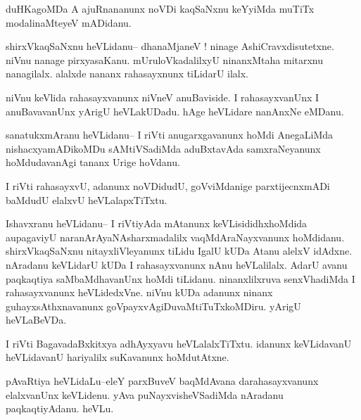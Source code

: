 \documentclass{article}
\begin{document}
\begin{mn}%
duHKagoMDa A ajuRnananunx noVDi kaqSaNxnu keYyiMda muTiTx modalinaMteyeV mADidanu.
\end{mn}

\begin{mn}%
shirxVkaqSaNxnu heVLidanu-- dhanaMjaneV ! ninage AshiCravxdisutetxne. niVnu nanage 
pirxyasaKanu. mUruloVkadalilxyU  ninanxMtaha mitarxnu nanagilalx. alalxde nananx 
rahasayxnunx tiLidarU ilalx.
\end{mn}

\begin{mn}%
niVnu keVlida rahasayxvanunx niVneV anuBaviside. I rahasayxvanUnx I anuBavavanUnx yArigU 
heVLakUDadu. hAge heVLidare nanAnxNe eMDanu.
\end{mn}

\begin{mn}%
sanatukxmAranu heVLidanu-- I riVti anugarxgavanunx hoMdi AnegaLiMda nishacxyamADikoMDu 
sAMtiVSadiMda aduBxtavAda samxraNeyanunx hoMdudavanAgi tananx Urige hoVdanu.
\end{mn}

\begin{mn}%
I riVti rahasayxvU, adanunx noVDidudU, goVviMdanige parxtijecnxmADi baMdudU elalxvU 
heVLalapxTiTxtu.
\end{mn}

\begin{mn}%
Ishavxranu heVLidanu-- I riVtiyAda mAtanunx keVLisididhxhoMdida aupagaviyU 
naranArAyaNAsharxmadalilx vaqMdAraNayxvanunx hoMdidanu. shirxVkaqSaNxnu nitayxliVleyanunx 
tiLidu IgalU kUDa Atanu alelxV idAdxne. nAradanu keVLidarU kUDa I rahasayxvanunx nAnu 
heVLalilalx. AdarU avanu paqkaqtiya saMbaMdhavanUnx hoMdi tiLidanu. ninanxlilxruva 
senxVhadiMda I rahasayxvanunx heVLidedxVne. niVnu kUDa adanunx ninanx guhayxsAthxnavanunx 
goVpayxvAgiDuvaMtiTuTxkoMDiru. yArigU heVLaBeVDa.
\end{mn}

\begin{mn}%
I riVti BagavadaBxkitxya adhAyxyavu heVLalalxTiTxtu. idanunx keVLidavanU heVLidavanU 
hariyalilx suKavanunx hoMdutAtxne.
\end{mn}


\begin{mn}%
pAvaRtiya heVLidaLu--eleY parxBuveV baqMdAvana darahasayxvanunx elalxvanUnx keVLidenu. 
yAva puNayxvisheVSadiMda nAradanu paqkaqtiyAdanu. heVLu.
\end{mn}
\end{document}

